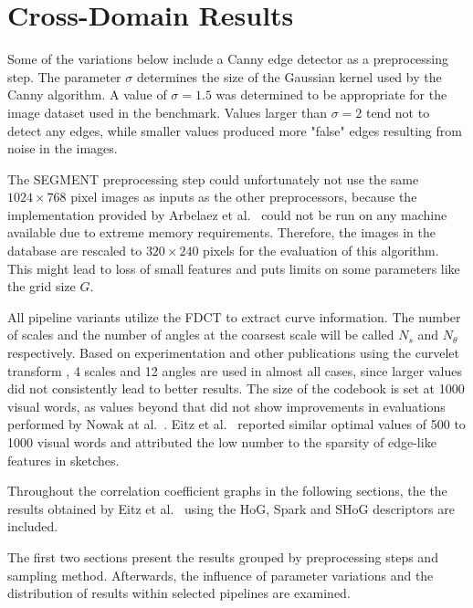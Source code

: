 \section{Cross-Domain Results}\label{sec:cross_results}

Some of the variations below include a Canny edge detector as a preprocessing
step. The parameter $\sigma$ determines the size of the Gaussian kernel used by
the Canny algorithm. A value of $\sigma = 1.5$ was determined to be appropriate
for the image dataset used in the benchmark. Values larger than $\sigma = 2$
tend not to detect any edges, while smaller values produced more "false" edges
resulting from noise in the images.

The SEGMENT preprocessing step could unfortunately not use the same $1024
\times 768$ pixel images as inputs as the other preprocessors, because the
implementation provided by Arbelaez et al.\ \autocite{arbelaez_contour_2011}
could not be run on any machine available due to extreme memory requirements.
Therefore, the images in the database are rescaled to $320 \times 240$ pixels
for the evaluation of this algorithm. This might lead to loss of small features
    and puts limits on some parameters like the grid size $G$.

All pipeline variants utilize the FDCT to extract curve information. The number
of scales and the number of angles at the coarsest scale will be called $N_s$
and $N_{\theta}$ respectively. Based on experimentation and other publications
using the curvelet transform \autocite{mandal_curvelet_2009}
\autocite{guha_curvelet_????}, 4 scales and 12 angles are used in almost all
cases, since larger values did not consistently lead to better results. The
size of the codebook is set at 1000 visual words, as values beyond that did
not show improvements in evaluations performed by Nowak at al.\
\autocite{nowak_sampling_2006}. Eitz et al.\ \autocite{eitz_sketch-based_2011}
reported similar optimal values of 500 to 1000 visual words and attributed the
low number to the sparsity of edge-like features in sketches.

Throughout the correlation coefficient graphs in the following sections, the
the results obtained by Eitz et al.\ \autocite{eitz_sketch-based_2011} using
the HoG, Spark and SHoG descriptors are included.

The first two sections present the results grouped by preprocessing steps and
sampling method. Afterwards, the influence of parameter variations and the
distribution of results within selected pipelines are examined.






